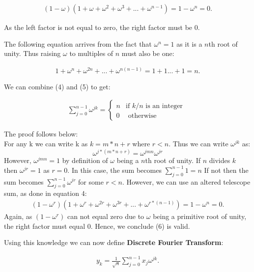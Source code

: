 \documentclass[DIV=calc, paper=a4, fontsize=11pt, twocolumn]{scrartcl}   %
\begin{document}
\begin{align}
(1 - \omega)(1 + \omega + \omega^2 + \omega^3 + ... + \omega^{n-1}) = 1 - \omega^n = 0.
\end{align}

As the left factor is not equal to zero, the right factor must be 0. \par The following equation arrives from the fact that $\omega^n = 1$ as it is a $n$th root of unity. Thus raising $\omega$ to multiples of $n$ must also be one:

\begin{align}
1 + \omega^n + \omega^{2n} +  ... + \omega^{n(n-1)} = 1 + 1  ...+ 1 = n.
\end{align}

We can combine (4) and (5) to get:


\begin{align}
\sum_{j=0}^{n-1}\omega^{jk} = \left\{
   \begin{array}{ll}
      n  & \mbox{if } k/n \mbox{ is an integer }\\
      0 & \mbox{ otherwise }
   \end{array}
\right.
\end{align}

The proof follows below: \\

For any k we can write k as $k = m*n +r $ where $r < n$. Thus we can write $\omega^{jk}$ as: $$\omega^{j*(m*n+r)} = \omega^{jmn}\omega^{jr} $$ However, $\omega^{jmn}=1$ by definition of $\omega$ being a $n$th root of unity. If $n$ divides $k$ then $\omega^{jr} = 1$ as $r=0$. In this case, the sum becomes $\sum_{j=0}^{n-1}1=n$ If not then the sum becomes $\sum_{j=0}^{n-1}\omega^{jr}$ for some $r<n$. However, we can use an altered telescope sum, as done in equation 4:
\begin{align}
(1 - \omega^r)(1 + \omega^r + \omega^{2r} + \omega^{3r} + ... + \omega^{r*(n-1)}) = 1 - \omega^n = 0.
\end{align}
Again, as $(1 - \omega^r)$ can not equal zero due to $\omega$ being a primitive root of unity, the right factor must equal 0. Hence, we conclude (6) is valid.


\par Using this knowledge we can now define \textbf{Discrete Fourier Transform}:

\begin{align}
y_k = \frac{1}{\sqrt{n}}\sum_{j=0}^{n-1}x_j\omega^{jk}.
\end{align}
\end{document}
